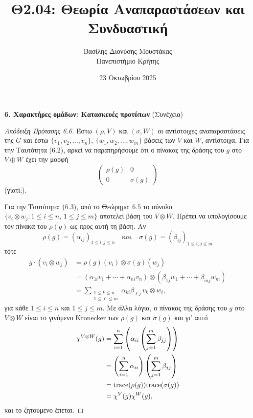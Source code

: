 \documentclass[12pt,a4paper,reqno]{amsart}
\title{Θ2.04: Θεωρία Αναπαραστάσεων και Συνδυαστική}
\author[Β.~Δ. Μουστακας]{Βασίλης Διονύσης Μουστάκας \\ Πανεπιστήμιο Κρήτης}
\date{23 Οκτωβρίου 2025}
\begin{document}
\begingroup
\def\uppercasenonmath#1{} %
\let\MakeUppercase\relax %
\maketitle
\endgroup

\setcounter{section}{6}
\setcounter{theorem}{6}
\begin{center}
    \textbf{6. Χαρακτήρες ομάδων: Κατασκευές προτύπων
} (Συνέχεια)
\end{center}

\begin{proof}[Απόδειξη Πρότασης 6.6]
    Έστω $(\rho, V)$ και $(\sigma, W)$ οι αντίστοιχες αναπαραστάσεις της $G$ και έστω $\{v_1, v_2, \dots, v_n\}$, $\{w_1, w_2, \dots, w_m\}$ βάσεις των $V$ και $W$, αντίστοιχα. Για την Ταυτότητα (6.2), αρκεί να παρατηρήσουμε ότι ο πίνακας της δράσης του $g$ στο $V \oplus W$ έχει την μορφή
    \[
    \begin{pmatrix}
        \rho(g) & 0 \\
        0       & \sigma(g)
    \end{pmatrix}
    \]
    (γιατί;). 
    
    Για την Ταυτότητα~(6.3), από το Θεώρημα~6.5 το σύνολο $\{v_i \otimes w_j : 1 \le i \le n, \, 1 \le j \le m\}$ αποτελεί βάση του $V \otimes W$. Πρέπει να υπολογίσουμε τον πίνακα του $\rho(g)$ ως προς αυτή τη βάση. Αν 
    \[
    \rho(g) = (\alpha_{ij})_{1 \le i, j \le n} \quad \text{και} \quad \sigma(g) = (\beta_{ij})_{1 \le i,j \le m}
    \]
    τότε 
    \begin{align*}
        g \cdot (v_i \otimes w_j)
        &= \rho(g)(v_i) \otimes \sigma(g)(w_j) \\
        &= \left(
            \alpha_{1i}v_1 + \cdots + \alpha_{ni}v_n 
        \right) \otimes 
        \left(
            \beta_{1j}w_1 + \cdots + \beta_{mj}w_m
        \right) \\ 
        &= \sum_{\substack{1 \le k \le n \\ 1 \le \ell \le m}} \alpha_{ki}\beta_{\ell{j}} \, v_k \otimes w_\ell,
    \end{align*}
    για κάθε $ 1 \le i \le n$ και $1 \le j \le m$. Με άλλα λόγια, ο πίνακας της δράσης του $g$ στο $V\otimes{W}$ είναι το γινόμενο Kronecker των $\rho(g)$ και $\sigma(g)$ και γι' αυτό
    \begin{align*}
        \chi^{V\otimes{W}}(g) 
        &= \sum_{i=1}^n \left(\alpha_{ii}\left(\sum_{j=1}^m\beta_{jj}\right)\right) \\
        &= \left(\sum_{i=1}^n\alpha_{ii}\right)\left(\sum_{j=1}^m\beta_{jj}\right) \\
        &= \mathrm{trace}(\rho(g))\mathrm{trace}(\sigma(g)) \\
        &= \chi^V(g)\chi^W(g),
    \end{align*}
    και το ζητούμενο έπεται.    


\end{proof}
\end{document}
